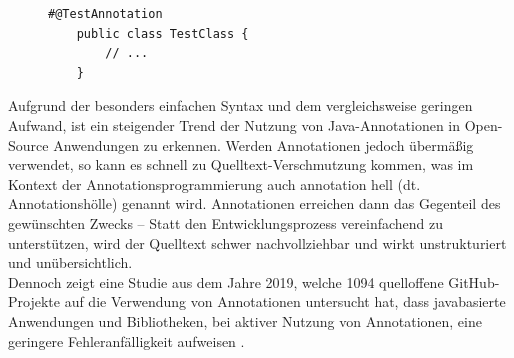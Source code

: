 \begin{figure}[H]
	\centering
	\begin{lstlisting}[caption={Beispiel einer annotierten Klasse.}, captionpos=b, label=lst:annotated_example]
	#@TestAnnotation
	public class TestClass {
	    // ...
	}
	\end{lstlisting}
\end{figure}
\noindent Aufgrund der besonders einfachen Syntax und dem vergleichsweise geringen Aufwand, ist ein steigender Trend der Nutzung von Java-Annotationen in Open-Source Anwendungen zu erkennen. Werden Annotationen jedoch übermäßig verwendet, so kann es schnell zu Quelltext-Verschmutzung kommen, was im Kontext der Annotationsprogrammierung auch \glqq annotation hell\grqq{} (dt. Annotationshölle) genannt wird. Annotationen erreichen dann das Gegenteil des gewünschten Zwecks -- Statt den Entwicklungsprozess vereinfachend zu unterstützen, wird der Quelltext schwer nachvollziehbar und wirkt unstrukturiert und unübersichtlich.\\
Dennoch zeigt eine Studie aus dem Jahre 2019, welche 1094 quelloffene GitHub-Projekte auf die Verwendung von Annotationen untersucht hat, dass javabasierte Anwendungen und Bibliotheken, bei aktiver Nutzung von Annotationen, eine geringere Fehleranfälligkeit aufweisen \cite{Yu2019}.
